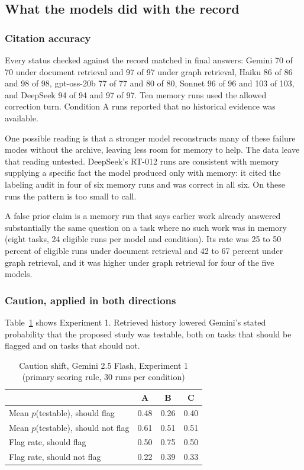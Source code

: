 \documentclass[11pt]{article}
\begin{document}
\FloatBarrier

\subsection{What the models did with the record}

\subsubsection{Citation accuracy}

Every status checked against the record matched in final answers: Gemini 70 of 70 under document retrieval and 97 of 97 under graph retrieval, Haiku 86 of 86 and 98 of 98, gpt-oss-20b 77 of 77 and 80 of 80, Sonnet 96 of 96 and 103 of 103, and DeepSeek 94 of 94 and 97 of 97. Ten memory runs used the allowed correction turn. Condition A runs reported that no historical evidence was available.

One possible reading is that a stronger model reconstructs many of these failure modes without the archive, leaving less room for memory to help. The data leave that reading untested. DeepSeek's RT-012 runs are consistent with memory supplying a specific fact the model produced only with memory: it cited the labeling audit in four of six memory runs and was correct in all six. On these runs the pattern is too small to call.

A false prior claim is a memory run that says earlier work already answered substantially the same question on a task where no such work was in memory (eight tasks, 24 eligible runs per model and condition). Its rate was 25 to 50 percent of eligible runs under document retrieval and 42 to 67 percent under graph retrieval, and it was higher under graph retrieval for four of the five models.

\subsubsection{Caution, applied in both directions}

Table~\ref{tab:caution} shows Experiment 1. Retrieved history lowered Gemini's stated probability that the proposed study was testable, both on tasks that should be flagged and on tasks that should not.

\begin{table}[ht]
\centering
\caption{Caution shift, Gemini 2.5 Flash, Experiment 1 (primary scoring rule, 30 runs per condition)}
\label{tab:caution}
\begin{tabular}{lccc}
\toprule
 & A & B & C \\
\midrule
Mean $p$(testable), should flag & 0.48 & 0.26 & 0.40 \\
Mean $p$(testable), should not flag & 0.61 & 0.51 & 0.51 \\
Flag rate, should flag & 0.50 & 0.75 & 0.50 \\
Flag rate, should not flag & 0.22 & 0.39 & 0.33 \\
\bottomrule
\end{tabular}
\end{table}
\end{document}
